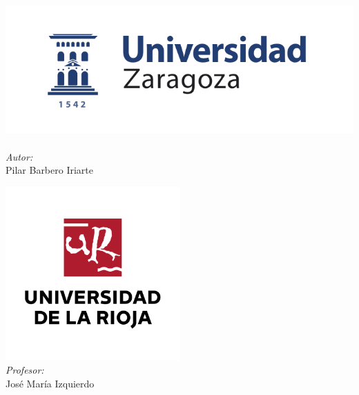\documentclass{article}
\begin{document}
\begin{titlepage}
\begin{center}
\noindent
\begin{minipage}{0.4\textwidth}
\begin{flushleft} \large
\includegraphics[width=1.1\textwidth]{../images/logoUZ.png}~\\
\emph{Autor:}\\
Pilar Barbero Iriarte 
\end{flushleft}
\end{minipage}%
\begin{minipage}{0.4\textwidth}
\begin{flushright} \large
\includegraphics[width=0.5\textwidth]{../images/logoUNIRIOJA.png}~\\

\emph{Profesor:} \\
Jos\'e Mar\'ia Izquierdo
\end{flushright}
\end{minipage}

\end{center}


\end{titlepage}

\pagebreak
\tableofcontents
\pagebreak
\end{document}
